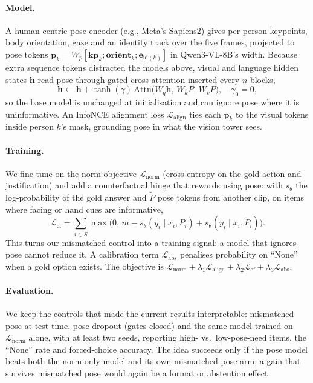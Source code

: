 \paragraph{Model.}
A human-centric pose encoder (e.g., Meta's Sapiens2) gives per-person keypoints, body orientation, gaze and an identity track over the five frames, projected to pose tokens $\mathbf p_k=W_p[\mathbf{kp}_k;\mathbf{orient}_k;\mathbf e_{\mathrm{id}(k)}]$ in Qwen3-VL-8B's width. Because extra sequence tokens distracted the models above, visual and language hidden states $\mathbf h$ read pose through gated cross-attention inserted every $n$ blocks,
\begin{equation}
\mathbf h\leftarrow\mathbf h+\tanh(\gamma)\,\mathrm{Attn}\big(W_q\mathbf h,\,W_kP,\,W_vP\big),\quad\gamma_0=0,
\end{equation}
so the base model is unchanged at initialisation and can ignore pose where it is uninformative. An InfoNCE alignment loss $\mathcal L_{\mathrm{align}}$ ties each $\mathbf p_k$ to the visual tokens inside person $k$'s mask, grounding pose in what the vision tower sees.

\paragraph{Training.}
We fine-tune on the norm objective $\mathcal L_{\mathrm{norm}}$ (cross-entropy on the gold action and justification) and add a counterfactual hinge that rewards using pose: with $s_\theta$ the log-probability of the gold answer and $\tilde P$ pose tokens from another clip, on items where facing or hand cues are informative,
\begin{equation}
\mathcal L_{\mathrm{cf}}=\textstyle\sum_{i\in S}\max\big(0,\,m-s_\theta(y_i\mid x_i,P_i)+s_\theta(y_i\mid x_i,\tilde P_i)\big).
\end{equation}
This turns our mismatched control into a training signal: a model that ignores pose cannot reduce it. A calibration term $\mathcal L_{\mathrm{abs}}$ penalises probability on ``None'' when a gold option exists. The objective is $\mathcal L_{\mathrm{norm}}+\lambda_1\mathcal L_{\mathrm{align}}+\lambda_2\mathcal L_{\mathrm{cf}}+\lambda_3\mathcal L_{\mathrm{abs}}$.

\paragraph{Evaluation.}
We keep the controls that made the current results interpretable: mismatched pose at test time, pose dropout (gates closed) and the same model trained on $\mathcal L_{\mathrm{norm}}$ alone, with at least two seeds, reporting high- vs.\ low-pose-need items, the ``None'' rate and forced-choice accuracy. The idea succeeds only if the pose model beats both the norm-only model and its own mismatched-pose arm; a gain that survives mismatched pose would again be a format or abstention effect.
